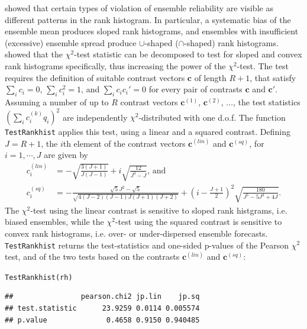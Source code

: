 \documentclass[10pt]{article}\usepackage[]{graphicx}\usepackage[]{color}
\makeatletter
\newcommand{\hlstd}[1]{\textcolor[rgb]{0,0,0}{#1}}%
\newcommand{\hlkwd}[1]{\textcolor[rgb]{0,0.267,0.4}{#1}}%
\newenvironment{kframe}{%
 \def\at@end@of@kframe{}%
 \ifinner\ifhmode%
  \def\at@end@of@kframe{\end{minipage}}%
  \begin{minipage}{\columnwidth}%
 \fi\fi%
 \def\FrameCommand##1{\hskip\@totalleftmargin \hskip-\fboxsep
 \colorbox{shadecolor}{##1}\hskip-\fboxsep
     \hskip-\linewidth \hskip-\@totalleftmargin \hskip\columnwidth}%
 \MakeFramed {\advance\hsize-\width
   \@totalleftmargin\z@ \linewidth\hsize
   \@setminipage}}%
 {\par\unskip\endMakeFramed%
 \at@end@of@kframe}
\newenvironment{knitrout}{}{} %
\newcommand{\code}[1]{\texttt{#1}}
\makeatother
\begin{document}
\citet{hamill2001interpretation} showed that certain types of violation of ensemble reliability are visible as different patterns in the rank histogram.
In particular, a systematic bias of the ensemble mean produces sloped rank histograms, and ensembles with insufficient (excessive) ensemble spread produce $\cup$-shaped ($\cap$-shaped) rank histograms.
\citet{jolliffe2008evaluating} showed that the $\chi^2$-test statistic can be decomposed to test for sloped and convex rank histograms specifically, thus increasing the power of the $\chi^2$-test.
The test requires the definition of suitable contrast vectors $\mathbf{c}$ of length $R+1$, that satisfy $\sum_i c_i = 0$, $\sum_i c_i^2 = 1$, and $\sum_i c_i c_i' = 0$ for every pair of contrasts $\mathbf{c}$ and $\mathbf{c}'$.
Assuming a number of up to $R$ contrast vectors $\mathbf{c}^{(1)}$, $\mathbf{c}^{(2)}$, $\dots$, the test statistics $(\sum_i c^{(k)}_i q_i)^2$ are independently $\chi^2$-distributed with one d.o.f. 
The function \code{TestRankhist} applies this test, using a linear and a squared contrast. 
Defining $J=R+1$, the $i$th element of the contrast vectors $\mathbf{c}^{(lin)}$ and $\mathbf{c}^{(sq)}$, for $i=1,\cdots,J$ are given by
%
\begin{align}
c^{(lin)}_i & = -\sqrt{\frac{3(J+1)}{J (J-1)}} + i \sqrt{\frac{12}{J^3 - J}}\text{, and}\\
c^{(sq)}_i & =  - \frac{\sqrt{5}  J^2 - \sqrt{5}}{\sqrt{4(J - 2)  (J-1) J (J+1) (J+2)}}+ \left(i - \frac{J+1}{2}\right)^2   \sqrt{\frac{180}{ J^5 - 5 J^3 + 4 J}}.
\end{align}
%
The $\chi^2$-test using the linear contrast is sensitive to sloped rank histgrams, i.e. biased ensembles, while the $\chi^2$-test using the squared contrast is sensitive to convex rank histograms, i.e. over- or under-dispersed ensemble forecasts.
\code{TestRankhist} returns the test-statistics and one-sided p-values of the Pearson $\chi^2$ test, and of the two tests based on the contrasts $\mathbf{c}^{(lin)}$ and $\mathbf{c}^{(sq)}$:

\begin{knitrout}
\color{fgcolor}\begin{kframe}
\begin{alltt}
\hlkwd{TestRankhist}\hlstd{(rh)}
\end{alltt}
\begin{verbatim}
##                pearson.chi2 jp.lin    jp.sq
## test.statistic      23.9259 0.0114 0.005574
## p.value              0.4658 0.9150 0.940485
\end{verbatim}
\end{kframe}
\end{knitrout}
\end{document}
